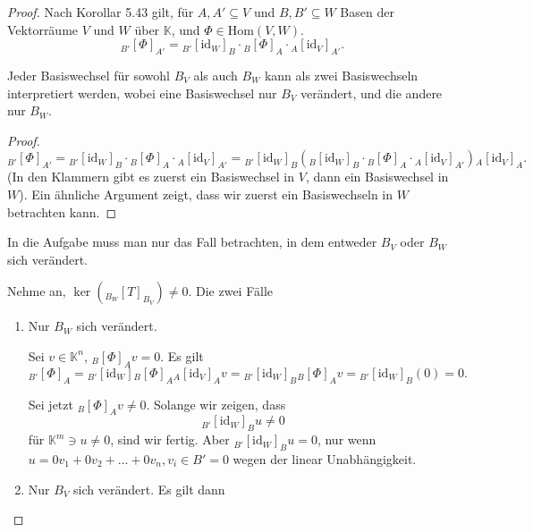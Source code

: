 \begin{proof}
Nach Korollar 5.43 gilt, f\"{u}r $A,A' \subseteq V$ und $B,B'\subseteq W$ Basen der Vektorräume $V$ und $W$ über $\mathbb{K}$, und $\Phi\in \text{Hom}(V,W)$.
 \[
	 _{B'}\left[ \Phi \right]_{A'}={}_{B'}[\text{id}_W]_B\cdot{}_B[\Phi]_A\cdot{}_A[\text{id}_V]_{A'}
.\] 
\begin{Lemma}
	Jeder Basiswechsel f\"{u}r sowohl $B_V$ als auch $B_W$ kann als zwei Basiswechseln interpretiert werden, wobei eine Basiswechsel nur $B_V$ verändert, und die andere nur $B_W$.
\end{Lemma}
\begin{proof}
	\[
		_{B'}\left[ \Phi \right]_{A'}={}_{B'}[\text{id}_W]_B\cdot{}_B[\Phi]_A\cdot{}_A[\text{id}_V]_{A'}={}_{B'}[\text{id}_W]_B\left( {}_B[\text{id}_W]_B\cdot {}_B[\Phi]_A\cdot {}_A[\text{id}_V]_{A'} \right) {}_A[\text{id}_V]_A
	.\]
	(In den Klammern gibt es zuerst ein Basiswechsel in $V$, dann ein Basiswechsel in $W$). Ein ähnliche Argument zeigt, dass wir zuerst ein Basiswechseln in $W$ betrachten kann.
\end{proof}
\begin{Corollary}
	In die Aufgabe muss man nur das Fall betrachten, in dem entweder $B_V$ oder $B_W$ sich verändert. 
\end{Corollary}
	\begin{parts}
	\item Nehme an, $\ker({}_{B_W}[T]_{B_V})\neq 0$. Die zwei Fälle
		\begin{enumerate}[label=(\roman*)]
			\item Nur $B_W$ sich verändert.

				Sei $v\in\mathbb{K}^n$, $_B[\Phi]_Av=0$. Es gilt
				\[
					_{B'}[\Phi]_A={}_{B'}[\text{id}_W]{}_B[\Phi]_A{}_A[\text{id}_V]_Av={}_{B'}[\text{id}_W]_B{}_B[\Phi]_Av={}_{B'}[\text{id}_W]_B(0)=0
				.\] 

				Sei jetzt $_B[\Phi]_Av\neq 0$. Solange wir zeigen, dass
				\[
					_{B'}[\text{id}_W]_B u\neq 0
				\]
				f\"{u}r $\mathbb{K}^m\ni u\neq 0$, sind wir fertig. Aber $_{B'}[\text{id}_W]_Bu=0$, nur wenn $u=0v_1+0v_2+\dots+0v_n, v_i\in B'=0$ wegen der linear Unabhängigkeit.

			\item Nur $B_V$ sich verändert. Es gilt dann

			
		\end{enumerate}
	\end{parts}
\end{proof}
